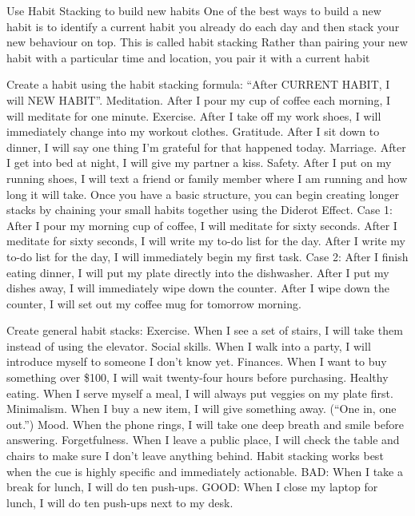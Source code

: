 \documentclass[10pt,twocolumn]{../notes}
\begin{document}
\Advice Use Habit Stacking to build new habits
\Quote One of the best ways to build a new habit is to identify a current habit you already do each day and then stack your new behaviour on top. This is called habit stacking
\Quote Rather than pairing your new habit with a particular time and location, you pair it with a current habit

\Advice Create a habit using the habit stacking formula: “After CURRENT HABIT, I will NEW HABIT”.
\Example Meditation. After I pour my cup of coffee each morning, I will meditate for one minute.
\Example Exercise. After I take off my work shoes, I will immediately change into my workout clothes.
\Example Gratitude. After I sit down to dinner, I will say one thing I’m grateful for that happened today.
\Example Marriage. After I get into bed at night, I will give my partner a kiss.
\Example Safety. After I put on my running shoes, I will text a friend or family member where I am running and how long it will take.
\Fact Once you have a basic structure, you can begin creating longer stacks by chaining your small habits together using the Diderot Effect.
\Example Case 1: After I pour my morning cup of coffee, I will meditate for sixty seconds. After I meditate for sixty seconds, I will write my to-do list for the day. After I write my to-do list for the day, I will immediately begin my first task.
\Example Case 2: After I finish eating dinner, I will put my plate directly into the dishwasher. After I put my dishes away, I will immediately wipe down the counter. After I wipe down the counter, I will set out my coffee mug for tomorrow morning.

\Advice Create general habit stacks:
\Example Exercise. When I see a set of stairs, I will take them instead of using the elevator.
\Example Social skills. When I walk into a party, I will introduce myself to someone I don’t know yet.
\Example Finances. When I want to buy something over \$100, I will wait twenty-four hours before purchasing.
\Example Healthy eating. When I serve myself a meal, I will always put veggies on my plate first.
\Example Minimalism. When I buy a new item, I will give something away. (“One in, one out.”)
\Example Mood. When the phone rings, I will take one deep breath and smile before answering.
\Example Forgetfulness. When I leave a public place, I will check the table and chairs to make sure I don’t leave anything behind.
\Fact Habit stacking works best when the cue is highly specific and immediately actionable.
\Example BAD: When I take a break for lunch, I will do ten push-ups.
\Example GOOD: When I close my laptop for lunch, I will do ten push-ups next to my desk.
\end{document}
